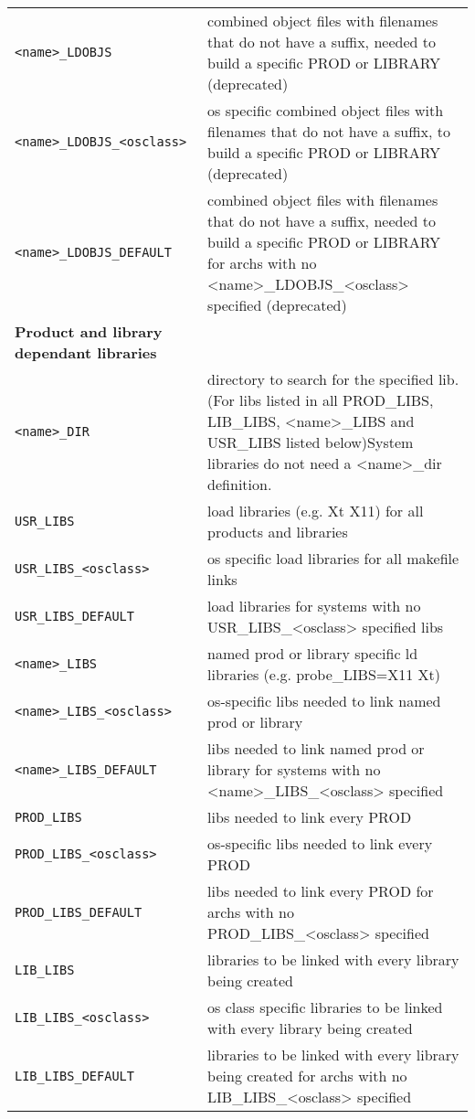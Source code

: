 \begin{center}
\begin{longtable}{p{2.94784in}p{3.76247in}}
\verb|<name>_LDOBJS| & combined object files with filenames that do not have a suffix, needed to build a specific PROD or LIBRARY (deprecated)\\
\verb|<name>_LDOBJS_<osclass>| & os specific combined object files with filenames that do not have a suffix, to build a specific PROD or LI\textbar{}BRARY (deprecated)\\
\verb|<name>_LDOBJS_DEFAULT| & combined object files with filenames that do not have a suffix, needed to build a specific PROD or LIBRARY for archs with no \textless{}name\textgreater{}\_LDOBJS\_\textless{}osclass\textgreater{} specified (deprecated)\\
\textbf{Product and library dependant libraries} & \\
\hline
\verb|<name>_DIR| & directory to search for the specified lib. (For libs listed in all PROD\_LIBS, LIB\_LIBS, \textless{}name\textgreater{}\_LIBS and USR\_LIBS listed below)System libraries do not need a \textless{}name\textgreater{}\_dir definition.\\
\verb|USR_LIBS| & load libraries (e.g. Xt X11) for all products and libraries\\
\verb|USR_LIBS_<osclass>| & os specific load libraries for all makefile links\\
\verb|USR_LIBS_DEFAULT| & load libraries for systems with no USR\_LIBS\_\textless{}osclass\textgreater{} specified libs\\
\verb|<name>_LIBS| & named prod or library specific ld libraries (e.g. probe\_LIBS=X11 Xt)\\
\verb|<name>_LIBS_<osclass>| & os-specific libs needed to link named prod or library\\
\verb|<name>_LIBS_DEFAULT| & libs needed to link named prod or library for systems with no \textless{}name\textgreater{}\_LIBS\_\textless{}osclass\textgreater{} specified\\
\verb|PROD_LIBS| & libs needed to link every PROD\\
\verb|PROD_LIBS_<osclass>| & os-specific libs needed to link every PROD\\
\verb|PROD_LIBS_DEFAULT| & libs needed to link every PROD for archs with no PROD\_LIBS\_\textless{}osclass\textgreater{} specified\\
\verb|LIB_LIBS| & libraries to be linked with every library being created\\
\verb|LIB_LIBS_<osclass>| & os class specific libraries to be linked with every library being created\\
\verb|LIB_LIBS_DEFAULT| & libraries to be linked with every library being created for archs with no LIB\_LIBS\_\textless{}osclass\textgreater{} specified\\

\end{longtable}
\end{center}
